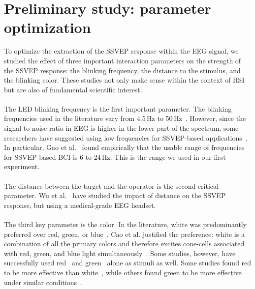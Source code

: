 \documentclass[smallextended]{svjour3}
\begin{document}
\section{Preliminary study: parameter optimization}
\label{sec:prestudy}

To optimize the extraction of the SSVEP response within the EEG signal, we studied the effect of three important interaction parameters on the strength of the SSVEP response: the blinking frequency, the distance to the stimulus, and the blinking color. 
These studies not only make sense within the context of HSI but are also of fundamental scientific interest. \\
\\
The LED blinking frequency is the first important parameter. The blinking frequencies used in the literature vary from 4.5\,Hz to 50\,Hz~\cite{Zhu2010}. However, since the signal to noise ratio in EEG is higher in the lower part of the spectrum, some researchers have suggested using low frequencies for SSVEP-based applications~\cite{paper6}. 
In particular, Gao et al.~\cite{SSVEPfiability} found empirically that the usable range of frequencies for SSVEP-based BCI is 6 to 24\,Hz. This is the range we used in our first experiment.\\
\\
The distance between the target and the operator is the second critical parameter. Wu et al.~\cite{wu2013effect} have studied the impact of distance on the SSVEP response, but using a medical-grade EEG headset.\\
\\
The third key parameter is the color. 
In the literature, white was predominantly preferred over red, green, or blue~\cite{paper6,aljshamee2014beyond,aljshamee2016discriminate,cao2012flashing,paper2}. Cao et al. justified the preference: white is a combination of all the primary colors and therefore excites cone-cells associated with red, green, and blue light simultaneously~\cite{cao2012flashing}. 
Some studies, however, have successfully used red~\cite{Faller2010,jian2014improving,paper4} and green~\cite{chua2004effects,duvinage2013performance,SSVEPfiability,hvaring2014comparison,paper4,mouli2013performance} alone as stimuli as well. Some studies found red to be more effective than white~\cite{Faller2010,hvaring2014comparison}, while others found green to be more effective under similar conditions~\cite{chua2004effects,duvinage2013performance}. 
\end{document}
